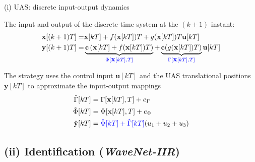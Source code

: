\documentclass{beamer}
\newcommand{\bld}[1]{\mbox{$\mathbf{#1}$}}
\newcommand{\cc}{\bld{c}}
\newcommand{\x}{\bld{x}}
\newcommand{\dx}{\dot{\bld{x}}}
\newcommand{\uu}{\bld{u}}
\newcommand{\y}{\bld{y}}
\begin{document}
\begin{frame}{(i) UAS: discrete input-output dynamics}

The input and output of the discrete-time system  at the $(k+1)$ instant:
%
\begin{eqnarray}
\x[(k+1)T] = & \x[kT] + f(\x[kT])T + g(\x[kT])T\uu[kT]  \\
\y[(k+1)T]  = & \underbrace{\cc\left(\x[kT] + f(\x[kT])T\right)}_{\textcolor{blue}{\Phi[\x[kT],T]}}
+\underbrace{\cc(g(\x[kT])T)}_{\textcolor{blue}{\Gamma[\x[kT],T]}}\uu[kT]  \nonumber \label{out}
\end{eqnarray}

 The strategy uses the control input $\uu[kT]$ and the UAS translational positions $\y[kT]$ to approximate the input-output mappings 
\begin{align}
    \hat \Gamma[kT] &= \Gamma[\x[kT],T]+e_\Gamma \nonumber\\ %
    \hat \Phi[kT]       &= \Phi[\x[kT],T] +e_\Phi \\
    \hat{\y}[kT] &= \textcolor{blue}{\hat{\Phi}[kT] + \hat{\Gamma}[kT]}(u_1+u_2+u_3) \nonumber \label{estimacion}
\end{align}

\end{frame}





\subsection{(ii) Identification (\textit{WaveNet-IIR})} 

\end{document}
